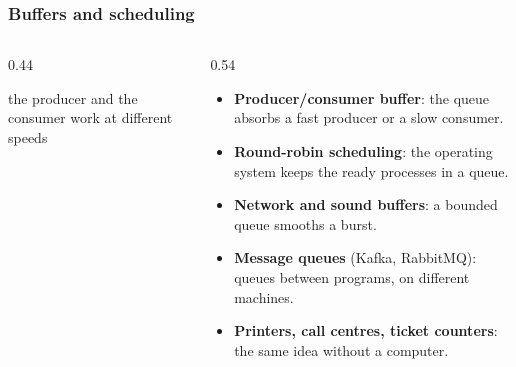 \documentclass[aspectratio=169,10pt,compress]{beamer}
\begin{document}
\begin{frame}[t,fragile] \frametitle{Buffers and scheduling}
  \begin{columns}[T]
    \begin{column}{0.44\textwidth}
      \begin{center}
      \end{center}
      \scriptsize the producer and the consumer work at different speeds
    \end{column}
    \begin{column}{0.54\textwidth}
      \begin{itemize}\small
        \item \textbf{Producer/consumer buffer}: the queue absorbs a fast producer or a slow consumer.
        \item \textbf{Round-robin scheduling}: the operating system keeps the ready processes in a queue.
        \item \textbf{Network and sound buffers}: a bounded queue smooths a burst.
        \item \textbf{Message queues} (Kafka, RabbitMQ): queues between programs, on different machines.
        \item \textbf{Printers, call centres, ticket counters}: the same idea without a computer.
      \end{itemize}
    \end{column}
  \end{columns}
\end{frame}
\end{document}
